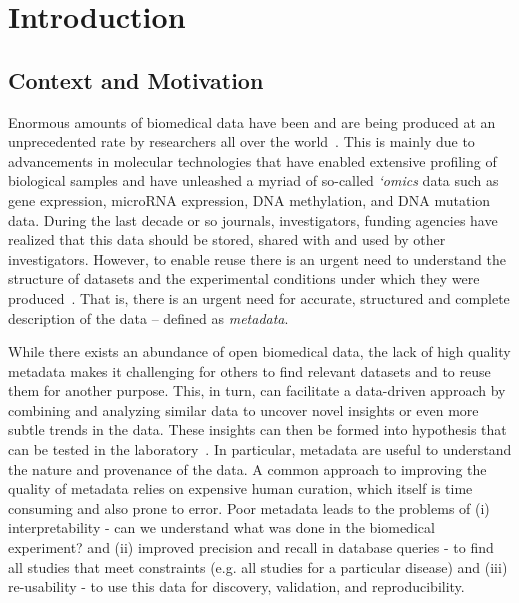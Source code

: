 \chapter{Introduction}\label{chap:intro}

\section{Context and Motivation}

Enormous amounts of biomedical data have been and are being produced at an unprecedented rate by researchers all over the world~\cite{hoffman2013use}. 
This is mainly due to advancements in molecular technologies that have enabled extensive profiling of biological samples and have unleashed a myriad of so-called \emph{`omics} data such as gene expression, microRNA expression, DNA methylation, and DNA mutation data. 
During the last decade or so journals, investigators, funding agencies have realized that this data should be stored, shared with and used by other investigators.
However, to enable reuse there is an urgent need to understand the structure of datasets and the experimental conditions under which they were produced~\cite{borgman2012conundrum}.
That is, there is an urgent need for accurate, structured and complete description of the data -- defined as \emph{metadata}.

While there exists an abundance of open biomedical data, the lack of high quality metadata makes it challenging for others to find relevant datasets and to reuse them for another purpose. 
This, in turn, can facilitate a data-driven approach by combining and analyzing similar data to uncover novel insights or even more subtle trends in the data.
These insights can then be formed into hypothesis that can be tested in the laboratory~\cite{barrett2012ncbi}.
In particular, metadata are useful to understand the nature and provenance of the data. A common approach to improving the quality of metadata relies on expensive human curation, which itself is time consuming and also prone to error.
Poor metadata leads to the problems of (i) interpretability - can we understand what was done in the biomedical experiment? and (ii) improved precision and recall in database queries - to find all studies that meet constraints (e.g. all studies for a particular disease) and (iii) re-usability - to use this data for discovery, validation, and reproducibility.


